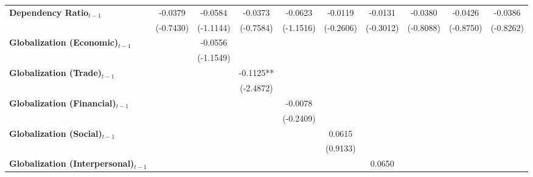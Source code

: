 \begin{center}
\begin{tabular}{lccccccccc}
\textbf{Dependency Ratio$_{t-1}$}   &    -0.0379     &     -0.0584      &     -0.0373      &     -0.0623      &     -0.0119      &     -0.0131      &     -0.0380      &     -0.0426      &     -0.0386       \\
\textbf{ }                         &   (-0.7430)    &    (-1.1144)     &    (-0.7584)     &    (-1.1516)     &    (-0.2606)     &    (-0.3012)     &    (-0.8088)     &    (-0.8750)     &    (-0.8262)      \\
\textbf{Globalization (Economic)$_{t-1}$}             &                &     -0.0556      &                  &                  &                  &                  &                  &                  &                   \\
\textbf{ }                         &                &    (-1.1549)     &                  &                  &                  &                  &                  &                  &                   \\
\textbf{Globalization (Trade)$_{t-1}$}             &                &                  &    -0.1125**     &                  &                  &                  &                  &                  &                   \\
\textbf{ }                         &                &                  &    (-2.4872)     &                  &                  &                  &                  &                  &                   \\
\textbf{Globalization (Financial)$_{t-1}$}             &                &                  &                  &     -0.0078      &                  &                  &                  &                  &                   \\
\textbf{ }                         &                &                  &                  &    (-0.2409)     &                  &                  &                  &                  &                   \\
\textbf{Globalization (Social)$_{t-1}$}             &                &                  &                  &                  &      0.0615      &                  &                  &                  &                   \\
\textbf{ }                         &                &                  &                  &                  &     (0.9133)     &                  &                  &                  &                   \\
\textbf{Globalization (Interpersonal)$_{t-1}$}             &                &                  &                  &                  &                  &      0.0650      &                  &                  &                   \\

\end{tabular}
\end{center}
